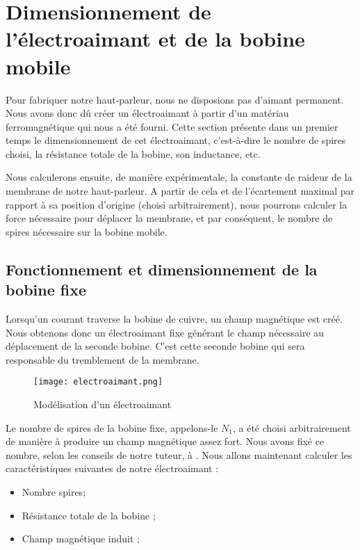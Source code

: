 

\section{Dimensionnement de l'électroaimant et de la bobine mobile}
Pour fabriquer notre haut-parleur, nous ne disposions pas d'aimant permanent. Nous avons donc
dû créer un électroaimant à partir d'un matériau ferromagnétique qui nous a été fourni.
Cette section présente dans un premier temps le dimensionnement de cet électroaimant, c'est-à-dire le
nombre de spires choisi, la résistance totale de la bobine, son inductance, etc.

Nous calculerons ensuite, de manière expérimentale, la constante de raideur de la membrane de
notre haut-parleur. A partir de cela et de l'écartement maximal par rapport à sa position d'origine 
(choisi arbitrairement), 
nous pourrons calculer la force nécessaire pour déplacer la membrane, et par conséquent, le nombre
de spires nécessaire sur la bobine mobile.

\subsection{Fonctionnement et dimensionnement de la bobine fixe}
Lorsqu'un courant traverse la bobine de cuivre, un champ magnétique est créé.  Nous obtenons 
donc un électroaimant fixe générant le champ nécessaire au déplacement de la seconde bobine. 
C'est cette seconde bobine qui sera responsable du tremblement de la membrane.

\begin{figure}[ht!]
\centering
\texttt{[image: electroaimant.png]}
\caption{Modélisation d'un électroaimant}
\label{modélisation de l'électroaimant}
\end{figure}

Le nombre de spires de la bobine fixe, appelons-le $N_1$, a été choisi arbitrairement de manière à produire un
champ magnétique assez fort. Nous avons fixé ce nombre, selon les conseils de notre tuteur, à . 
Nous allons maintenant calculer les caractéristiques suivantes de notre électroaimant :

\begin{itemize}
	\item Nombre spires;
	\item Résistance totale de la bobine ;
	\item Champ magnétique induit ;
\end{itemize}

